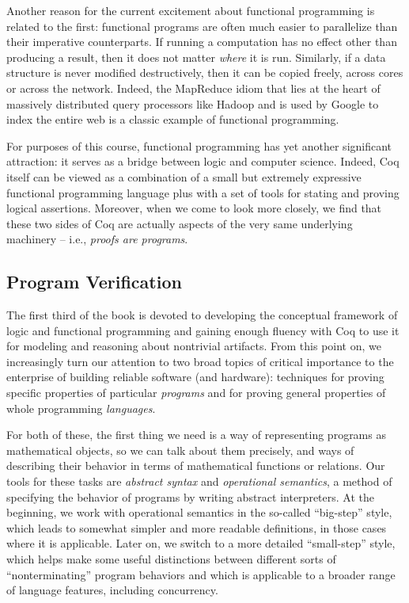 \documentclass[12pt]{report}
\begin{document}
    Another reason for the current excitement about functional
    programming is related to the first: functional programs are often
    much easier to parallelize than their imperative counterparts.  If
    running a computation has no effect other than producing a result,
    then it does not matter \textit{where} it is run.  Similarly, if a data
    structure is never modified destructively, then it can be copied
    freely, across cores or across the network.  Indeed, the MapReduce
    idiom that lies at the heart of massively distributed query
    processors like Hadoop and is used by Google to index the entire
    web is a classic example of functional programming.


    For purposes of this course, functional programming has yet
    another significant attraction: it serves as a bridge between
    logic and computer science.  Indeed, Coq itself can be viewed as a
    combination of a small but extremely expressive functional
    programming language plus with a set of tools for stating and
    proving logical assertions.  Moreover, when we come to look more
    closely, we find that these two sides of Coq are actually aspects
    of the very same underlying machinery -- i.e., \textit{proofs are
    programs}.  

\subsection{Program Verification}



 The first third of the book is devoted to developing the
    conceptual framework of logic and functional programming and
    gaining enough fluency with Coq to use it for modeling and
    reasoning about nontrivial artifacts.  From this point on, we
    increasingly turn our attention to two broad topics of critical
    importance to the enterprise of building reliable software (and
    hardware): techniques for proving specific properties of
    particular \textit{programs} and for proving general properties of whole
    programming \textit{languages}.


    For both of these, the first thing we need is a way of
    representing programs as mathematical objects, so we can talk
    about them precisely, and ways of describing their behavior in
    terms of mathematical functions or relations.  Our tools for these
    tasks are \textit{abstract syntax} and \textit{operational semantics}, a method
    of specifying the behavior of programs by writing abstract
    interpreters.  At the beginning, we work with operational
    semantics in the so-called ``big-step'' style, which leads to
    somewhat simpler and more readable definitions, in those cases
    where it is applicable.  Later on, we switch to a more detailed
    ``small-step'' style, which helps make some useful distinctions
    between different sorts of ``nonterminating'' program behaviors and
    which is applicable to a broader range of language features,
    including concurrency.
\end{document}

